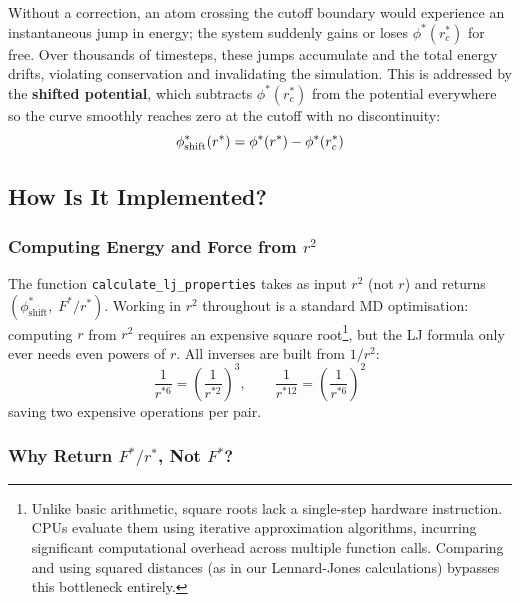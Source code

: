 Without a correction, an atom crossing the cutoff boundary would experience an instantaneous jump in energy; the system suddenly gains or loses $\phi^*(r_c^*)$ for free. Over thousands of timesteps, these jumps accumulate and the total energy drifts, violating conservation and invalidating the simulation. This is addressed by the \textbf{shifted potential}, which subtracts $\phi^*(r_c^*)$ from the potential everywhere so the curve smoothly reaches zero at the cutoff with no discontinuity:
\begin{equation}
    \phi^*_\text{shift}(r^{*}) = \phi^*(r^{*}) - \phi^*(r_c^*)
    \label{eq:lj_shifted}
\end{equation}

\subsection{How Is It Implemented?}

\subsubsection{Computing Energy and Force from $r^2$}

The function \texttt{calculate\_lj\_properties} takes as input $r^2$ (not $r$) and returns \\ $(\phi^*_\text{shift},\; F^*/r^*)$. Working in $r^2$ throughout is a standard MD optimisation: computing $r$ from $r^2$ requires an expensive square root\footnote[2]{Unlike basic arithmetic, square roots lack a single-step hardware instruction. CPUs evaluate them using iterative approximation algorithms, incurring significant computational overhead across multiple function calls. Comparing and using squared distances (as in our Lennard-Jones calculations) bypasses this bottleneck entirely.}, but the LJ formula only ever needs even powers of $r$. All inverses are built from $1/r^2$:
\begin{equation}
    \frac{1}{r^{*6}} = \left(\frac{1}{r^{*2}}\right)^3, \qquad
    \frac{1}{r^{*12}} = \left(\frac{1}{r^{*6}}\right)^2
\end{equation}
saving two expensive operations per pair.

\subsubsection{Why Return $F^*/r^*$, Not $F^*$?}

